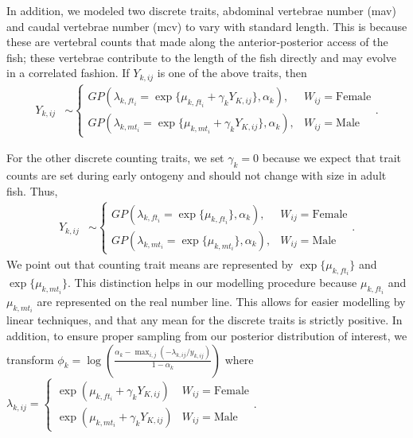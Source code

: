 \documentclass[
  12pt,
]{article}
\begin{document}
In addition, we modeled two discrete traits, abdominal vertebrae number
(mav) and caudal vertebrae number (mcv) to vary with standard length.
This is because these are vertebral counts that made along the
anterior-posterior access of the fish; these vertebrae contribute to the
length of the fish directly and may evolve in a correlated fashion. If
\(Y_{k,ij}\) is one of the above traits, then \begin{align}
{Y}_{k,ij} & \sim \left\{\begin{array}{ll} GP(\lambda_{k,ft_i} = \exp\{\mu_{k,ft_i} + \gamma_kY_{K,ij}\},\alpha_k), & W_{ij} = \text{Female} \\ GP(\lambda_{k,mt_i} = \exp\{\mu_{k,mt_i} + \gamma_kY_{K,ij}\},\alpha_k), & W_{ij} = \text{Male} \end{array}\right..
\label{eq:disc_corr}
\end{align}

For the other discrete counting traits, we set \(\gamma_k = 0\) because
we expect that trait counts are set during early ontogeny and should not
change with size in adult fish. Thus, \begin{align}
{Y}_{k,ij} & \sim \left\{\begin{array}{ll} GP(\lambda_{k,ft_i} = \exp\{\mu_{k,ft_i}\},\alpha_k), & W_{ij} = \text{Female} \\ GP(\lambda_{k,mt_i} = \exp\{\mu_{k,mt_i}\},\alpha_k), & W_{ij} = \text{Male} \end{array}\right..
\label{eq:disc_ind}
\end{align} We point out that counting trait means are represented by
\(\exp\{\mu_{k,ft_i}\}\) and \(\exp\{\mu_{k,mt_i}\}\). This distinction
helps in our modelling procedure because \(\mu_{k,ft_i}\) and
\(\mu_{k,mt_i}\) are represented on the real number line. This allows
for easier modelling by linear techniques, and that any mean for the
discrete traits is strictly positive. In addition, to ensure proper
sampling from our posterior distribution of interest, we transform
\(\phi_k = \log\left(\frac{\alpha_k - \max_{i,j}(-\lambda_{k,ij}/y_{k,ij})}{1 - \alpha_k}\right)\)
where
\(\lambda_{k,ij} = \left\{\begin{array}{cc} \exp(\mu_{k,ft_i} + \gamma_k Y_{K,ij}) & W_{ij} = \text{Female} \\ \exp(\mu_{k,mt_i} + \gamma_k Y_{K,ij}) & W_{ij} = \text{Male} \end{array}\right.\).
\end{document}
